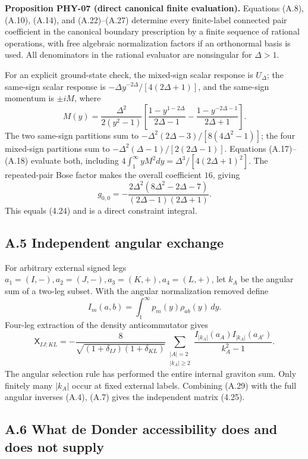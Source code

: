 \documentclass[a4paper,11pt]{article}
\numberwithin{equation}{section}
\begin{document}
\textbf{Proposition PHY-07 (direct canonical finite evaluation).} Equations (A.8), (A.10), (A.14), and (A.22)--(A.27) determine every finite-label connected pair coefficient in the canonical boundary prescription by a finite sequence of rational operations, with free algebraic normalization factors if an orthonormal basis is used. All denominators in the rational evaluator are nonsingular for \(\Delta>1\).

For an explicit ground-state check, the mixed-sign scalar response is \(U_\Delta\); the same-sign scalar response is \(-\Delta y^{-2\Delta}/[4(2\Delta+1)]\), and the same-sign momentum is \(\pm iM\), where \[
M(y)=\frac{\Delta^2}{2(y^2-1)}
\left[\frac{1-y^{1-2\Delta}}{2\Delta-1}
-\frac{1-y^{-2\Delta-1}}{2\Delta+1}\right].
\] The two same-sign partitions sum to \(-\Delta^2(2\Delta-3)/[8(4\Delta^2-1)]\); the four mixed-sign partitions sum to \(-\Delta^2(\Delta-1)/[2(2\Delta-1)]\). Equations (A.17)--(A.18) evaluate both, including \(4\int_1^\infty yM^2dy=\Delta^3/[4(2\Delta+1)^2]\). The repeated-pair Bose factor makes the overall coefficient \(16\), giving \[
g_{0,0}=-\frac{2\Delta^2(8\Delta^2-2\Delta-7)}
{(2\Delta-1)(2\Delta+1)}.
\tag{A.28}
\] This equals (4.24) and is a direct constraint integral.

\hypertarget{a.5-independent-angular-exchange}{%
\subsection{A.5 Independent angular exchange}\label{a.5-independent-angular-exchange}}

For arbitrary external signed legs \(a_1=(I,-),a_2=(J,-),a_3=(K,+),a_4=(L,+)\), let \(k_A\) be the angular sum of a two-leg subset. With the angular normalization removed define \[
I_m(a,b)=\int_1^\infty p_m(y)\rho_{ab}(y)\,dy .
\] Four-leg extraction of the density anticommutator gives \[
\boxed{
\mathsf X_{IJ;KL}
=-\frac8{\sqrt{(1+\delta_{IJ})(1+\delta_{KL})}}
\sum_{\substack{|A|=2\\|k_A|\ge2}}
\frac{I_{|k_A|}(a_A)I_{|k_A|}(a_{A^c})}{k_A^2-1}.
}
\tag{A.29}
\] The angular selection rule has performed the entire internal graviton sum. Only finitely many \(|k_A|\) occur at fixed external labels. Combining (A.29) with the full angular inverses (A.4), (A.7) gives the independent matrix (4.25).

\hypertarget{a.6-what-de-donder-accessibility-does-and-does-not-supply}{%
\subsection{A.6 What de Donder accessibility does and does not supply}\label{a.6-what-de-donder-accessibility-does-and-does-not-supply}}
\end{document}
